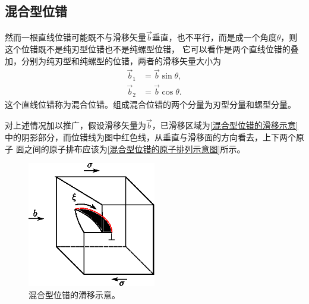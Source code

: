             \subsection{混合型位错}
                然而一根直线位错可能既不与滑移矢量$\vec{b}$垂直，也不平行，而是成一个角度$\theta$，则这个位错既不是纯刃型位错也不是纯螺型位错，
                它可以看作是两个直线位错的叠加，分别为纯刃型和纯螺型的位错，两者的滑移矢量大小为
                \begin{align}
                    \vec{b}_1&=\vec{b}\sin\theta,\\
                    \vec{b}_2&=\vec{b}\cos\theta.
                \end{align}
                这个直线位错称为混合位错。组成混合位错的两个分量为刃型分量和螺型分量。

                对上述情况加以推广，假设滑移矢量为$\vec{b}$，已滑移区域为\autoref{混合型位错的滑移示意}中的阴影部分，而位错线为图中红色线，从垂直与滑移面的方向看去，上下两个原子
                面之间的原子排布应该为\autoref{混合型位错的原子排列示意图}所示。
                \begin{figure}[ht]
                    \centering
                    \includegraphics[width=0.5\textwidth]{fig/混合型位错的滑移示意.eps}
                    \caption{混合型位错的滑移示意。}
                    \label{混合型位错的滑移示意}
                \end{figure}
                
